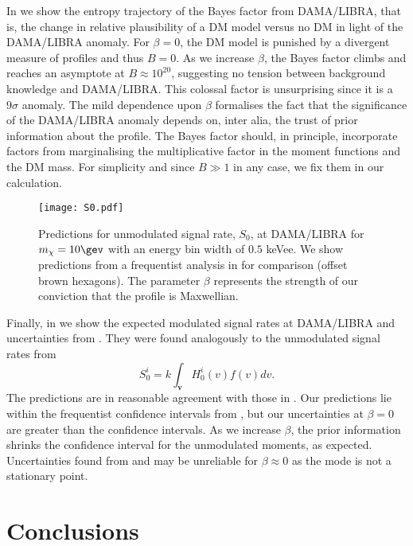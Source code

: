 \documentclass{article}
\begin{document}
In  we show the entropy trajectory of the Bayes factor from DAMA/LIBRA, that is, the change in relative plausibility of a DM model versus no DM in light of the DAMA/LIBRA anomaly. For $\beta=0$, the DM model is punished by a divergent measure of profiles and thus $B=0$. As we increase $\beta$, the Bayes factor climbs and reaches an asymptote at $B\approx 10^{20}$, suggesting no tension between background knowledge and DAMA/LIBRA. This colossal factor is unsurprising since it is a $9\sigma$ anomaly. The mild dependence upon $\beta$ formalises the fact that the significance of the DAMA/LIBRA anomaly depends on, inter alia, the trust of prior information about the profile. The Bayes factor should, in principle, incorporate factors from marginalising the multiplicative factor in the moment functions and the DM mass. For simplicity and since $B \gg 1$ in any case, we fix them in our calculation.

\begin{figure}[ht]
    \centering
    \texttt{[image: S0.pdf]}
    \caption{Predictions for unmodulated signal rate, $S_0$, at DAMA/LIBRA for $m_\chi =10\gev$ with an energy bin width of $0.5$ keVee. We show predictions from a frequentist analysis in  for comparison (offset brown hexagons). The parameter $\beta$ represents the strength of our conviction that the profile is Maxwellian.}
    \label{fig:S0}
\end{figure}

Finally, in  we show the expected modulated signal rates at DAMA/LIBRA and uncertainties from . They were found analogously to the unmodulated signal rates from
\begin{equation}
S_0^i = k \int_{\mathbf v} H_0^i(v) f(v) dv.
\end{equation}
The predictions are in reasonable agreement with those in .  Our predictions lie within the frequentist confidence intervals from , but our uncertainties at $\beta=0$ are greater than the confidence intervals. As we increase $\beta$, the prior information shrinks the confidence interval for the unmodulated moments, as expected. Uncertainties found from   and   may be unreliable for $\beta \approx 0$ as the mode is not a stationary point.

\section{Conclusions}\label{sec:conc}
\end{document}
